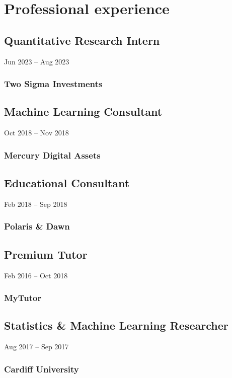 \documentclass{wgu-cv}
\begin{document}
\pagebreak

\section{Professional experience}

\subsection{Quantitative Research Intern}
{Jun 2023 -- Aug 2023}
\subsubsection{Two Sigma Investments}
\vspace{-0.20cm}

\subsection{Machine Learning Consultant}
{Oct 2018 -- Nov 2018}
\subsubsection{Mercury Digital Assets}
\vspace{-0.18cm}

\subsection{Educational Consultant}
{Feb 2018 -- Sep 2018}
\subsubsection{Polaris \& Dawn}
\vspace{-0.20cm}

\subsection{Premium Tutor}
{Feb 2016 -- Oct 2018}
\subsubsection{MyTutor}
\vspace{-0.20cm}

\subsection{Statistics \& Machine Learning Researcher}
{Aug 2017 -- Sep 2017}
\subsubsection{Cardiff University}
\vspace{-0.20cm}
\end{document}
